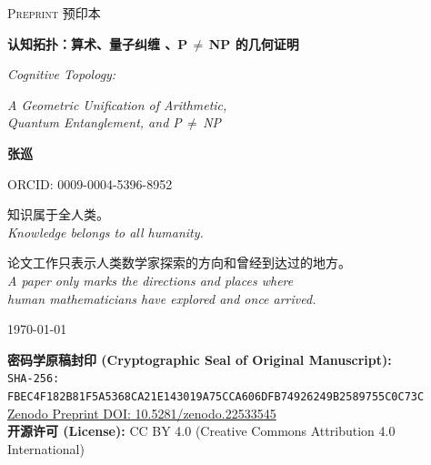 \documentclass[11pt,a4paper]{article}
\begin{document}
\begin{titlepage}
\thispagestyle{empty}
\centering
\color{DeepInk}
\vspace*{1.0cm}
{\normalsize\scshape\color{AccentBlue} Preprint \quad 预印本\par}
\vspace{1.0cm}
{\Huge\bfseries 认知拓扑：算术、量子纠缠 、P\,$\neq$\,NP 的几何证明\par}
\vspace{1.2cm}
{\Large\itshape Cognitive Topology:\par}\vspace{0.4cm}
{\large\itshape A Geometric Unification of Arithmetic,\\Quantum Entanglement, and P\,$\neq$\,NP\par}
\vspace{1.8cm}
{\LARGE\bfseries 张巡\par}
\vspace{0.4cm}
{\small\color{SubtleGray} ORCID: 0009-0004-5396-8952\par}
\vspace{2.0cm}
\begin{minipage}{0.84\textwidth}
\centering
{}
\large
知识属于全人类。\\[0.6em]
\itshape\normalsize Knowledge belongs to all humanity.
\end{minipage}
\vspace{1.4cm}
\begin{minipage}{0.84\textwidth}
\centering
{}
\normalsize\color{SubtleGray}
论文工作只表示人类数学家探索的方向和曾经到达过的地方。\\[0.6em]
\itshape A paper only marks the directions and places where\\
human mathematicians have explored and once arrived.
\end{minipage}
\vfill
{\large \today\par}
\vspace{1.0cm}
\end{titlepage}

\begin{center}
\textbf{密码学原稿封印 (Cryptographic Seal of Original Manuscript):} \\
\texttt{SHA-256: FBEC4F182B81F5A5368CA21E143019A75CCA606DFB74926249B2589755C0C73C} \\
\vspace{0.5em}
\href{https://doi.org/10.5281/zenodo.22533545}{Zenodo Preprint DOI: 10.5281/zenodo.22533545} \\
\vspace{0.5em}
\textbf{开源许可 (License):} CC BY 4.0 (Creative Commons Attribution 4.0 International)
\vspace{1em}
\end{center}
\end{document}
